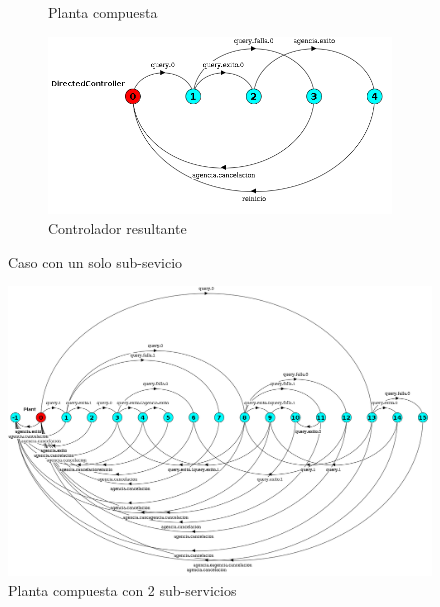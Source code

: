 \begin{figure}[htb]
\begin{center}
{\begin{subfigure}[t]{.6\textwidth}
				\caption{Planta compuesta}
				\label{fig:N1Planta}
			\end{subfigure}
			\begin{subfigure}[t]{.6\textwidth}
				\centering
				\includegraphics[width=\linewidth]{figures/ejemploServicios/N1Controlador.png}  
				\caption{Controlador resultante}
				\label{fig:controladorN1}
			\end{subfigure}
		}
		\caption{Caso con un solo sub-sevicio}
		\label{fig:N1}
	\end{center}
\end{figure}

\begin{figure}[htb]
	\includegraphics[width=\linewidth]{figures/ejemploServicios/N2Planta.png}  
	\caption{Planta compuesta con 2 sub-servicios}
	\label{fig:N2}
\end{figure}

